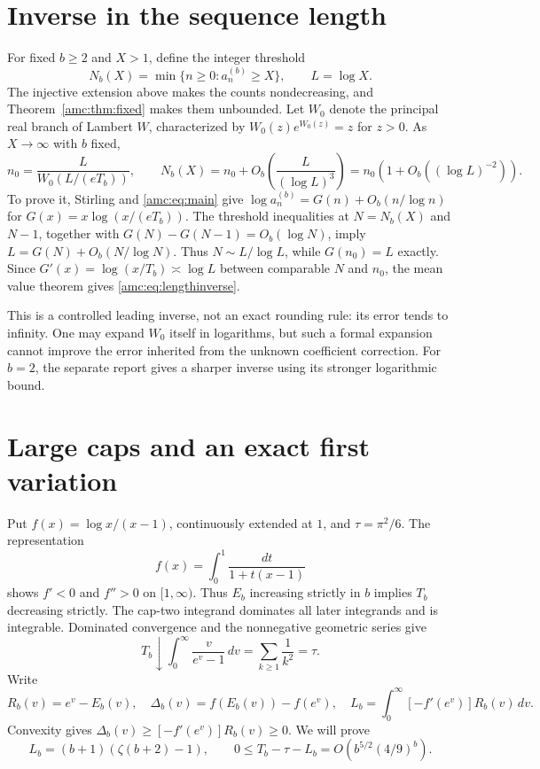 \documentclass[11pt,letterpaper]{article}
\theoremstyle{remark}\newtheorem{remark}[theorem]{Remark}
\begin{document}
\section{Inverse in the sequence length}\label{amc:sec:lengthinverse}
For fixed $b\ge2$ and $X>1$, define the integer threshold
\[
 N_b(X)=\min\{n\ge0:a_n^{(b)}\ge X\},\qquad L=\log X.
\]
The injective extension above makes the counts nondecreasing, and Theorem~\ref{amc:thm:fixed} makes them unbounded. Let $W_0$ denote the principal real branch of Lambert $W$, characterized by $W_0(z)e^{W_0(z)}=z$ for $z>0$. As $X\to\infty$ with $b$ fixed,
\begin{equation}\label{amc:eq:lengthinverse}
 n_0=\frac{L}{W_0(L/(eT_b))},\qquad
 N_b(X)=n_0+O_b\left(\frac{L}{(\log L)^3}\right)
 =n_0\left(1+O_b((\log L)^{-2})\right).
\end{equation}
To prove it, Stirling and \eqref{amc:eq:main} give
$\log a_n^{(b)}=G(n)+O_b(n/\log n)$ for
$G(x)=x\log(x/(eT_b))$. The threshold inequalities at $N=N_b(X)$ and $N-1$, together with $G(N)-G(N-1)=O_b(\log N)$, imply
$L=G(N)+O_b(N/\log N)$.
Thus $N\sim L/\log L$, while $G(n_0)=L$ exactly. Since
$G'(x)=\log(x/T_b)\asymp\log L$ between comparable $N$ and $n_0$, the mean value theorem gives \eqref{amc:eq:lengthinverse}.

This is a controlled leading inverse, not an exact rounding rule: its error tends to infinity. One may expand $W_0$ itself in logarithms, but such a formal expansion cannot improve the error inherited from the unknown coefficient correction. For $b=2$, the separate report gives a sharper inverse using its stronger logarithmic bound.

\section{Large caps and an exact first variation}\label{amc:sec:largecap}
Put $f(x)=\log x/(x-1)$, continuously extended at $1$, and $\tau=\pi^2/6$. The representation
\begin{equation}\label{amc:eq:frep}
 f(x)=\int_0^1\frac{dt}{1+t(x-1)}
\end{equation}
shows $f'<0$ and $f''>0$ on $[1,\infty)$. Thus $E_b$ increasing strictly in $b$ implies $T_b$ decreasing strictly. The cap-two integrand dominates all later integrands and is integrable. Dominated convergence and the nonnegative geometric series give
\[
 T_b\downarrow\int_0^\infty\frac{v}{e^v-1}\,dv
 =\sum_{k\ge1}\frac1{k^2}=\tau.
\]
Write
\[
 R_b(v)=e^v-E_b(v),\quad
 \Delta_b(v)=f(E_b(v))-f(e^v),\quad
 L_b=\int_0^\infty[-f'(e^v)]R_b(v)\,dv.
\]
Convexity gives $\Delta_b(v)\ge[-f'(e^v)]R_b(v)\ge0$. We will prove
\begin{equation}\label{amc:eq:variation}
 L_b=(b+1)(\zeta(b+2)-1),\qquad
 0\le T_b-\tau-L_b=O\!\left(b^{5/2}(4/9)^b\right).
\end{equation}
\end{document}
